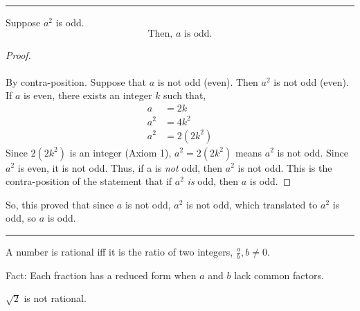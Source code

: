 \documentclass{article}
\def \proofDistance {5pt}
\newcommand{\proofseparator}{\par\noindent\rule{\textwidth}{0.4pt}}
\begin{document}
            \proofseparator

\newpage

        
            \begin{theorem}
                Suppose $a^2$ is odd. $$\text{Then, } a \text{ is odd.}$$
            \end{theorem}
        
            \vspace{\proofDistance}
        
            \begin{proof}
                \mbox{}\\[-\baselineskip] \\
                By contra-position. Suppose that $a$ is not odd (even). Then $a^2$ is not odd (even). If $a$ is even, there exists an integer $k$ such that,
                \begin{align*}
                    a &= 2k \\
                    a^2 &= 4k^2 \\
                    a^2 &= 2(2k^2)
                \end{align*}
                Since $2(2k^2)$ is an integer (Axiom 1), $a^2 = 2(2k^2)$ means $a^2$ is not odd. Since $a^2$ is even, it is not odd. Thus, if a is \textit{not} odd, then $a^2$ is not odd. This is the contra-position of the statement that if $a^2$ \textit{is} odd, then $a$ is odd. 
            \end{proof}
            So, this proved that since $a$ is not odd, $a^2$ is not odd, which translated to $a^2$ is odd, so $a$ is odd.
        
            \proofseparator
        
            \begin{definition}
                A number is rational iff it is the ratio of two integers, $\frac{a}{b}, b\ne 0$.
            \end{definition}
        
            \vspace{\proofDistance}
        
            Fact: Each fraction has a reduced form when $a$ and $b$ lack common factors.
            
            \begin{theorem}
                $\sqrt{2}$ is not rational.
            \end{theorem}
        
\end{document}
